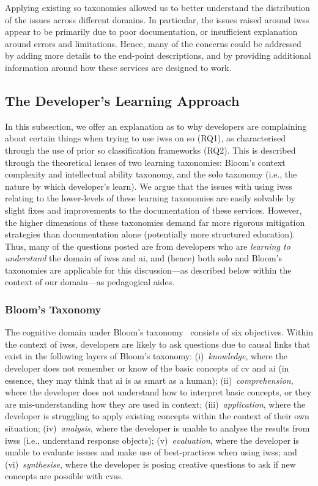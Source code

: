 Applying existing \gls{so} taxonomies allowed us to better understand the distribution of the issues across different domains. In particular, the issues raised around \glspl{iws} appear to be primarily due to poor documentation, or insufficient explanation around errors and limitations. Hence, many of the concerns could be addressed by adding more details to the end-point descriptions, and by providing additional information around how these services are designed to work.

\subsection{The Developer's Learning Approach}
\label{icse2020:ssec:bloomsolo}

In this subsection, we offer an explanation as to why developers are complaining about certain things when trying to use \glspl{iws} on \gls{so} (RQ1), as characterised through the use of prior \gls{so} classification frameworks (RQ2). This is described through the theoretical lenses of two learning taxonomies: Bloom's context complexity and intellectual ability taxonomy, and the \gls{solo} taxonomy (i.e., the nature by which developer's learn). We argue that the issues with using \glspl{iws} relating to the lower-levels of these learning taxonomies are easily solvable by slight fixes and improvements to the documentation of these services. However, the higher dimensions of these taxonomies demand far more rigorous mitigation strategies than documentation alone (potentially more structured education). Thus, many of the questions posted are from developers who are \textit{learning to understand} the domain of \glspl{iws} and \gls{ai}, and (hence) both \gls{solo} and Bloom's taxonomies are applicable for this discussion---as described below within the context of our domain---as pedagogical aides.

\subsubsection{Bloom's Taxonomy}

The cognitive domain under Bloom's taxonomy~\citep{Krathwohl:2001wr} consists of six objectives. Within the context of \glspl{iws}, developers are likely to ask questions due to causal links that exist in the following layers of Bloom's taxonomy:
%
(i)~\textit{knowledge}, where the developer does not remember or know of the basic concepts of \gls{cv} and \gls{ai} (in essence, they may think that \gls{ai} is as smart as a human);
%
(ii)~\textit{comprehension}, where the developer does not understand how to interpret basic concepts, or they are mis-understanding how they are used in context;
%
(iii)~\textit{application}, where the developer is struggling to apply existing concepts within the context of their own situation;
%
(iv)~\textit{analysis}, where the developer is unable to analyse the results from \glspl{iws} (i.e., understand response objects);
%
(v)~\textit{evaluation}, where the developer is unable to evaluate issues and make use of best-practices when using \glspl{iws}; and
%
(vi)~\textit{synthesise}, where the developer is posing creative questions to ask if new concepts are possible with \glspl{cvs}.

